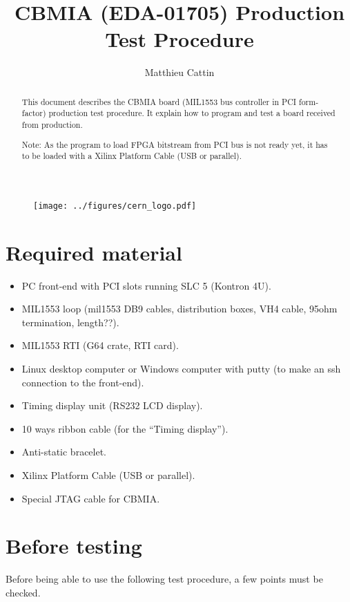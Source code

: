 \documentclass[11pt,a4paper]{article}
\title{CBMIA (EDA-01705) Production Test Procedure}
\author{Matthieu Cattin}
\begin{document}
\begin{figure}[t]
	\texttt{[image: ../figures/cern\_logo.pdf]}
	\label{fig:cern_logo}
\end{figure}
\maketitle


\begin{abstract}
This document describes the CBMIA board (MIL1553 bus controller in PCI form-factor) production test procedure. It explain how to program and test a board received from production.

Note: As the program to load FPGA bitstream from PCI bus is not ready yet, it has to be loaded with a Xilinx Platform Cable (USB or parallel).
\end{abstract}

\newpage 

\section{Required material}

\begin{itemize}
	\item PC front-end with PCI slots running SLC 5 (Kontron 4U).
	\item MIL1553 loop (mil1553 DB9 cables, distribution boxes, VH4 cable, 95ohm termination, length??).
	\item MIL1553 RTI (G64 crate, RTI card).
	\item Linux desktop computer or Windows computer with putty (to make an ssh connection to the front-end).
	\item Timing display unit (RS232 LCD display).
	\item 10 ways ribbon cable (for the "`Timing display"').
	\item Anti-static bracelet.
	\item Xilinx Platform Cable (USB or parallel).
	\item Special JTAG cable for CBMIA.
\end{itemize}


\section{Before testing}
Before being able to use the following test procedure, a few points must be checked.
\end{document}
